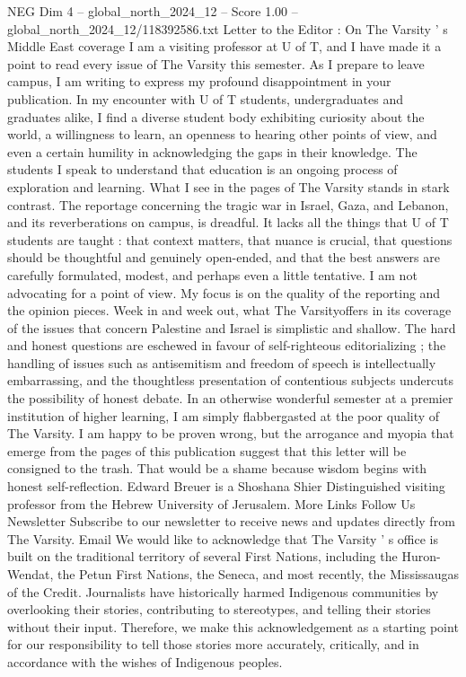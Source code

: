 \begin{textsample}{NEG Dim 4 – global\_north\_2024\_12 – Score 1.00 – global\_north\_2024\_12/118392586.txt}  \label{ex:f4_neg_138}
Letter to the Editor : On The Varsity ' s Middle East coverage I am a visiting professor at U of T, and I have made it a point to read every issue of The Varsity this semester.
As I prepare to leave campus, I am writing to express my profound disappointment in your publication.
In my encounter with U of T students, undergraduates and graduates alike, I find a diverse student body exhibiting curiosity about the world, a willingness to learn, an openness to hearing other points of view, and even a certain humility in acknowledging the gaps in their knowledge.
The students I speak to understand that education is an ongoing process of exploration and learning.
What I see in the pages of The Varsity stands in stark contrast.
The reportage concerning the tragic war in Israel, Gaza, and Lebanon, and its reverberations on campus, is dreadful.
It lacks all the things that U of T students are taught : that context matters, that nuance is crucial, that questions should be thoughtful and genuinely open-ended, and that the best answers are carefully formulated, modest, and perhaps even a little tentative.
I am not advocating for a point of view.
My focus is on the quality of the reporting and the opinion pieces.
Week in and week out, what The Varsityoffers in its coverage of the issues that concern Palestine and Israel is simplistic and shallow.
The hard and honest questions are eschewed in favour of self-righteous editorializing ; the handling of issues such as antisemitism and freedom of speech is intellectually embarrassing, and the thoughtless presentation of contentious subjects undercuts the possibility of honest debate.
In an otherwise wonderful semester at a premier institution of higher learning, I am simply flabbergasted at the poor quality of The Varsity.
I am happy to be proven wrong, but the arrogance and myopia that emerge from the pages of this publication suggest that this letter will be consigned to the trash.
That would be a shame because wisdom begins with honest self-reflection.
Edward Breuer is a Shoshana Shier Distinguished visiting professor from the Hebrew University of Jerusalem.
More Links Follow Us Newsletter Subscribe to our newsletter to receive news and updates directly from The Varsity.
Email We would like to acknowledge that The Varsity ' s office is built on the traditional territory of several First Nations, including the Huron-Wendat, the Petun First Nations, the Seneca, and most recently, the Mississaugas of the Credit.
Journalists have historically harmed Indigenous communities by overlooking their stories, contributing to stereotypes, and telling their stories without their input.
Therefore, we make this acknowledgement as a starting point for our responsibility to tell those stories more accurately, critically, and in accordance with the wishes of Indigenous peoples.

\end{textsample}
